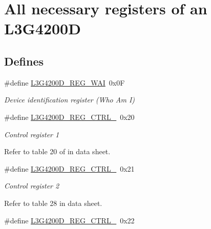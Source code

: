 \hypertarget{group___l3_g4200_d___r_e_g_i_s_t_e_r_s}{\section{\-All necessary registers of an \-L3\-G4200\-D}
\label{group___l3_g4200_d___r_e_g_i_s_t_e_r_s}
}
\subsection*{\-Defines}
\begin{DoxyCompactItemize}
\item 
\hypertarget{group___l3_g4200_d___r_e_g_i_s_t_e_r_s_gaf207c66cc749c8965c21580d47752790}{\#define \hyperlink{group___l3_g4200_d___r_e_g_i_s_t_e_r_s_gaf207c66cc749c8965c21580d47752790}{\-L3\-G4200\-D\-\_\-\-R\-E\-G\-\_\-\-W\-A\-I}~0x0\-F}\label{group___l3_g4200_d___r_e_g_i_s_t_e_r_s_gaf207c66cc749c8965c21580d47752790}

\begin{DoxyCompactList}\small\item\em \-Device identification register (\-Who \-Am \-I) \end{DoxyCompactList}\item 
\hypertarget{group___l3_g4200_d___r_e_g_i_s_t_e_r_s_ga924aee183efe2901f9cd4d8987625aa4}{\#define \hyperlink{group___l3_g4200_d___r_e_g_i_s_t_e_r_s_ga924aee183efe2901f9cd4d8987625aa4}{\-L3\-G4200\-D\-\_\-\-R\-E\-G\-\_\-\-C\-T\-R\-L\-\_}~0x20}\label{group___l3_g4200_d___r_e_g_i_s_t_e_r_s_ga924aee183efe2901f9cd4d8987625aa4}

\begin{DoxyCompactList}\small\item\em \-Control register 1\par
 \-Refer to table 20 of in data sheet. \end{DoxyCompactList}\item 
\hypertarget{group___l3_g4200_d___r_e_g_i_s_t_e_r_s_ga990e9dd3d8cb9d8d700786d94358fa7d}{\#define \hyperlink{group___l3_g4200_d___r_e_g_i_s_t_e_r_s_ga990e9dd3d8cb9d8d700786d94358fa7d}{\-L3\-G4200\-D\-\_\-\-R\-E\-G\-\_\-\-C\-T\-R\-L\-\_}~0x21}\label{group___l3_g4200_d___r_e_g_i_s_t_e_r_s_ga990e9dd3d8cb9d8d700786d94358fa7d}

\begin{DoxyCompactList}\small\item\em \-Control register 2\par
 \-Refer to table 28 in data sheet. \end{DoxyCompactList}\item 
\hypertarget{group___l3_g4200_d___r_e_g_i_s_t_e_r_s_gaecb66b209ff8cda854540df8a418a1f6}{\#define \hyperlink{group___l3_g4200_d___r_e_g_i_s_t_e_r_s_gaecb66b209ff8cda854540df8a418a1f6}{\-L3\-G4200\-D\-\_\-\-R\-E\-G\-\_\-\-C\-T\-R\-L\-\_}~0x22}\label{group___l3_g4200_d___r_e_g_i_s_t_e_r_s_gaecb66b209ff8cda854540df8a418a1f6}


\end{DoxyCompactItemize}
